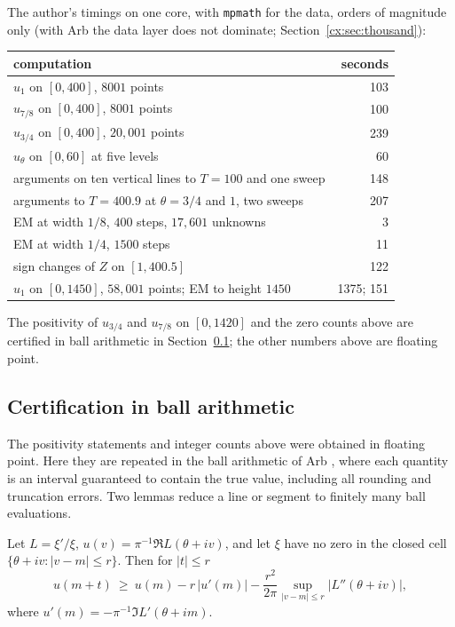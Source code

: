 The author's timings on one core, with \texttt{mpmath} for the data, orders of magnitude only (with Arb the data layer does not dominate; Section~\ref{cx:sec:thousand}):

\begin{center}
\small
\begin{tabular}{lr}
\toprule
computation & seconds\\
\midrule
$u_1$ on $[0,400]$, $8001$ points & 103\\
$u_{7/8}$ on $[0,400]$, $8001$ points & 100\\
$u_{3/4}$ on $[0,400]$, $20{,}001$ points & 239\\
$u_\theta$ on $[0,60]$ at five levels & 60\\
arguments on ten vertical lines to $T=100$ and one sweep & 148\\
arguments to $T=400.9$ at $\theta=3/4$ and $1$, two sweeps & 207\\
EM at width $1/8$, $400$ steps, $17{,}601$ unknowns & 3\\
EM at width $1/4$, $1500$ steps & 11\\
sign changes of $Z$ on $[1,400.5]$ & 122\\
$u_1$ on $[0,1450]$, $58{,}001$ points; EM to height $1450$ & 1375; 151\\
\bottomrule
\end{tabular}
\end{center}

The positivity of $u_{3/4}$ and $u_{7/8}$ on $[0,1420]$ and the zero counts above are certified in ball arithmetic in Section~\ref{cx:sec:certify}; the other numbers above are floating point.

\subsection{Certification in ball arithmetic}\label{cx:sec:certify}

The positivity statements and integer counts above were obtained in floating point. Here they are repeated in the ball arithmetic of Arb \cite{Arb}, where each quantity is an interval guaranteed to contain the true value, including all rounding and truncation errors. Two lemmas reduce a line or segment to finitely many ball evaluations.

\begin{lemma}[cells]\label{cx:lem:cell}
Let $L=\xi'/\xi$, $u(v)=\pi^{-1}\Re L(\theta+iv)$, and let $\xi$ have no zero in the closed cell $\{\theta+iv:|v-m|\le r\}$. Then for $|t|\le r$
\[
u(m+t)\ \ge\ u(m)-r\,|u'(m)|-\frac{r^2}{2\pi}\sup_{|v-m|\le r}|L''(\theta+iv)|,
\]
where $u'(m)=-\pi^{-1}\Im L'(\theta+im)$.
\end{lemma}

